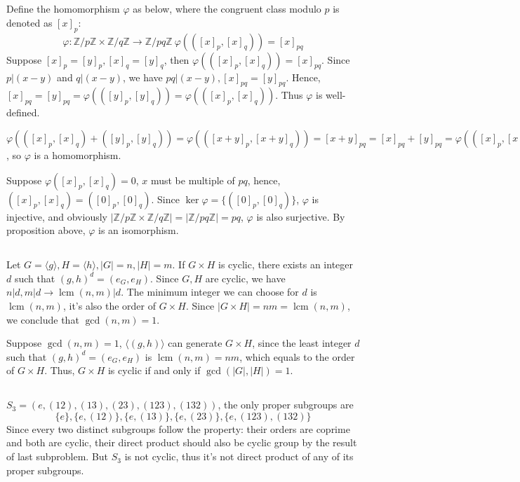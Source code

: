 \documentclass[12pt]{article}
\title{\mytitle}
\author{\textbf{\myauthor}}
\date{}
\DeclareMathOperator{\lcm}{lcm}
\begin{document}
\onehalfspacing
\maketitle

\section{}
\subsection{}
Define the homomorphism $\varphi$ as below, where the congruent class modulo $p$ is denoted as $[x]_p$:
$$\varphi:\mathbb{Z}/p\mathbb{Z}\times \mathbb{Z}/q\mathbb{Z}\rightarrow \mathbb{Z}/pq\mathbb{Z}\ \varphi(([x]_p,[x]_q))=[x]_{pq}$$
Suppose $[x]_p=[y]_p,[x]_q=[y]_q$, then $\varphi(([x]_p,[x]_q))=[x]_{pq}$. Since $p|(x-y)$ and $q|(x-y)$, we have $pq|(x-y), [x]_{pq}=[y]_{pq}$. Hence, $[x]_{pq}=[y]_{pq}=\varphi(([y]_{p},[y]_{q}))=\varphi(([x]_p,[x]_q))$. Thus $\varphi$ is well-defined.

$\varphi(([x]_p,[x]_q)+([y]_p,[y]_q))=\varphi(([x+y]_p,[x+y]_q))=[x+y]_{pq}=[x]_{pq}+[y]_{pq}=\varphi(([x]_p,[x]_q))+\varphi(([y]_p,[y]_q))$, so $\varphi$ is a homomorphism.

Suppose $\varphi([x]_p,[x]_q)=0$, $x$ must be multiple of $pq$, hence, $([x]_p,[x]_q)=([0]_p,[0]_q)$. Since $\ker{\varphi}=\{([0]_p,[0]_q)\}$, $\varphi$ is injective, and obviously $|\mathbb{Z}/p\mathbb{Z}\times \mathbb{Z}/q\mathbb{Z}|=|\mathbb{Z}/pq\mathbb{Z}|=pq$, $\varphi$ is also surjective. By proposition above, $\varphi$ is an isomorphism.
\subsection{}
Let $G=\langle g \rangle,H=\langle h\rangle, |G|=n, |H|=m$. If $G\times H$ is cyclic, there exists an integer $d$ such that $(g,h)^d=(e_G,e_H)$. Since $G,H$ are cyclic, we have $n|d,m|d\rightarrow\lcm{(n,m)}|d$. The minimum integer we can choose for $d$ is $\lcm{(n,m)}$, it's also the order of $G\times H$. Since $|G\times H|=nm=\lcm{(n,m)}$, we conclude that $\gcd{(n,m)}=1$.

Suppose $\gcd{(n,m)}=1$, $\langle (g,h)\rangle$ can generate $G\times H$, since the least integer $d$ such that $(g,h)^d=(e_G,e_H)$ is $\lcm{(n,m)}=nm$, which equals to the order of $G\times H$. Thus, $G\times H$ is cyclic if and only if $\gcd{(|G|,|H|)}=1$.
\subsection{}
$S_3=(e,(12),(13),(23),(123),(132))$, the only proper subgroups are 
$$\{e\}, \{e,(12)\}, \{e,(13)\},\{e, (23)\},\{e,(123),(132)\}$$
 Since every two distinct subgroups follow the property: their orders are coprime and both are cyclic, their direct product should also be cyclic group by the result of last subproblem. But $S_3$ is not cyclic, thus it's not direct product of any of its proper subgroups.
\end{document}
